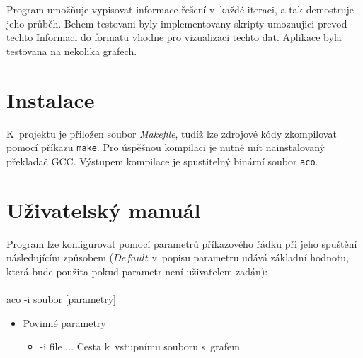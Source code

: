 \documentclass[a4paper, 12pt]{article}
\begin{document}
Program umožňuje vypisovat informace řešení v~každé iteraci, a tak demostruje jeho průběh. Behem testovani byly implementovany skripty umoznujici prevod techto
Informaci do formatu vhodne pro vizualizaci techto dat. Aplikace byla testovana na nekolika grafech.

\newpage
\appendix
\section{Instalace}
K~projektu je přiložen soubor \emph{Makefile}, tudíž lze zdrojové kódy zkompilovat pomocí příkazu \texttt{make}. Pro úspěšnou kompilaci je nutné mít
nainstalovaný překladač GCC. Výstupem kompilace je spustitelný binární soubor \texttt{aco}.
\label{app:install}
\section{Uživatelský manuál}
Program lze konfigurovat pomocí parametrů příkazového řádku při jeho spuštění následujícím způsobem ($Default$ v~popisu parametru udává základní hodnotu,
která bude použita pokud parametr není uživatelem zadán):
\\
\\
  aco -i soubor [parametry]
  \begin{itemize}
  \item Povinné parametry
    \begin{itemize}
      \item -i file ... Cesta k~vstupnímu souboru s~grafem
    \end{itemize}
  \end{itemize}
\end{document}

